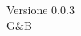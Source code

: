 \documentclass[12pt]{article}
\title{\myfont{Analisi dei requisiti}}
\author{Dream Corp.}
\date{ \myfont 05-12-2018}
\begin{document}
	\maketitle
	\begin{center}
	\huge Versione 0.0.3 
	\\G\&B
	\end{center}
	\newpage
	\tableofcontents
	\newpage
	




\end{document}
